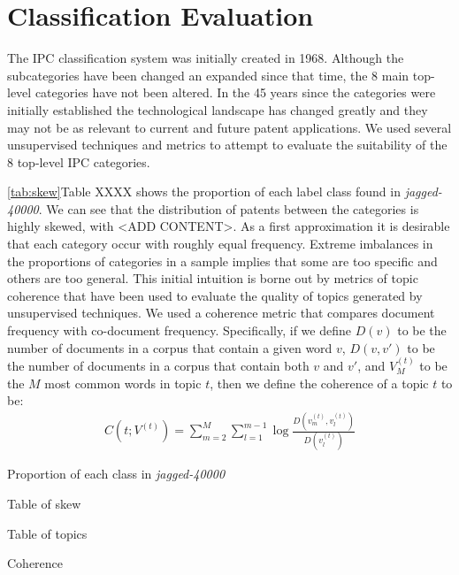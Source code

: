 \section{Classification Evaluation} %
\label{sec:classification_evaluation}

The IPC classification system was initially created in 1968. Although the subcategories have been changed an expanded since that time, the 8 main top-level categories have not been altered. In the 45 years since the categories were initially established the technological landscape has changed greatly and they may not be as relevant to current and future patent applications. We used several unsupervised techniques and metrics to attempt to evaluate the suitability of the 8 top-level IPC categories.

\ref{tab:skew}Table XXXX shows the proportion of each label class found in \emph{jagged-40000}. We can see that the distribution of patents between the categories is highly skewed, with <ADD CONTENT>. As a first approximation it is desirable that each category occur with roughly equal frequency. Extreme imbalances in the proportions of categories in a sample implies that some are too specific and others are too general. This initial intuition is borne out by metrics of topic coherence that have been used to evaluate the quality of topics generated by unsupervised techniques. We used a coherence metric that compares document frequency with co-document frequency\cite{Mimno_optimizingsemantic}. Specifically, if we define $D(v)$ to be the number of documents in a corpus that contain a given word $v$, $D(v, v')$ to be the number of documents in a corpus that contain both $v$ and $v'$, and $V^{(t)}_M$ to be the $M$ most common words in topic $t$, then we define the coherence of a topic $t$ to be:
\begin{align*}
	C(t;V^{(t)}) = \sum_{m=2}^M \sum_{l=1}^{m-1} \log \frac{D(v^{(t)}_m, v^{(t)}_l)}{D(v^{(t)}_l)}
\end{align*}



\begin{tablehere}
	\label{tab:skew}
	\centering
	\caption{Proportion of each class in \emph{jagged-40000}}
\end{tablehere}

Table of skew


Table of topics


Coherence


